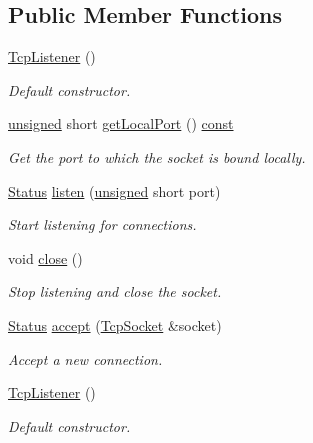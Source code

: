 \subsection*{Public Member Functions}
\begin{DoxyCompactItemize}
\item 
\hyperlink{classsf_1_1_tcp_listener_a59a1db5b6f4711a3e57390da2f8d9630}{Tcp\-Listener} ()
\begin{DoxyCompactList}\small\item\em Default constructor. \end{DoxyCompactList}\item 
\hyperlink{curses_8priv_8h_aca40206900cfc164654362fa8d4ad1e6}{unsigned} short \hyperlink{classsf_1_1_tcp_listener_a3bb62b92684cd1a14b14efdaf0471440}{get\-Local\-Port} () \hyperlink{term__entry_8h_a57bd63ce7f9a353488880e3de6692d5a}{const} 
\begin{DoxyCompactList}\small\item\em Get the port to which the socket is bound locally. \end{DoxyCompactList}\item 
\hyperlink{classsf_1_1_socket_a51bf0fd51057b98a10fbb866246176dc}{Status} \hyperlink{classsf_1_1_tcp_listener_a409d9350d3abfea9636df8cf4a61004e}{listen} (\hyperlink{curses_8priv_8h_aca40206900cfc164654362fa8d4ad1e6}{unsigned} short port)
\begin{DoxyCompactList}\small\item\em Start listening for connections. \end{DoxyCompactList}\item 
void \hyperlink{classsf_1_1_tcp_listener_a3a00a850506bd0f9f48867a0fe59556b}{close} ()
\begin{DoxyCompactList}\small\item\em Stop listening and close the socket. \end{DoxyCompactList}\item 
\hyperlink{classsf_1_1_socket_a51bf0fd51057b98a10fbb866246176dc}{Status} \hyperlink{classsf_1_1_tcp_listener_ae2c83ce5a64d50b68180c46bef0a7346}{accept} (\hyperlink{classsf_1_1_tcp_socket}{Tcp\-Socket} \&socket)
\begin{DoxyCompactList}\small\item\em Accept a new connection. \end{DoxyCompactList}\item 
\hyperlink{classsf_1_1_tcp_listener_a59a1db5b6f4711a3e57390da2f8d9630}{Tcp\-Listener} ()
\begin{DoxyCompactList}\small\item\em Default constructor. \end{DoxyCompactList}\item 

\end{DoxyCompactItemize}
